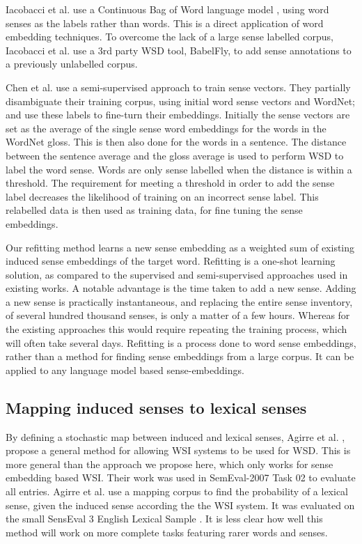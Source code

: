 \documentclass{article}
\def\parencite{\cite}
\begin{document}
Iacobacci et al.  use a Continuous Bag of Word language model \parencite{mikolov2013efficient}, using word senses as the labels rather than words.
This is a direct application of word embedding techniques.
To overcome the lack of a large sense labelled corpus, Iacobacci et al. use a 3rd party WSD tool, BabelFly, to add sense annotations to a previously unlabelled corpus.

Chen et al.  use a semi-supervised approach to train sense vectors.
They partially disambiguate their training corpus, using initial word sense vectors and WordNet; and use these labels to fine-turn their embeddings.
Initially the sense vectors are set as the average of the single sense word embeddings \parencite{mikolov2013efficient} for the words in the WordNet gloss.
This is then also done for the words in a sentence.
The distance between the sentence average and the gloss average is used to perform WSD to label the word sense. Words are only sense labelled when the distance is within a threshold.
The requirement for meeting a threshold in order to add the sense label  decreases the likelihood of training on an incorrect sense label.
This relabelled data is then used as training data, for fine tuning the sense embeddings.


Our refitting method learns a new sense embedding as a weighted sum of existing induced sense embeddings of the target word.
Refitting is a one-shot learning solution, as compared to the supervised and semi-supervised approaches used in existing works.
A notable advantage is the time taken to add a new sense.
Adding a new sense is practically instantaneous, and replacing the entire sense inventory, of several hundred thousand senses, is only a matter of a few hours.
Whereas for the existing approaches this would require repeating the training process, which will often take several days.
Refitting is a process done to word sense embeddings, rather than a method for finding sense embeddings from a large corpus. 
It can be applied to any language model based sense-embeddings.


\subsection{Mapping induced senses to lexical senses}\label{mapping}
By defining a stochastic map between induced and lexical senses, Agirre et al. , propose a general method for allowing WSI systems to be used for WSD.
This is more general than the approach we propose here, which only works for sense embedding based WSI. 
Their work was used in SemEval-2007 Task 02 \parencite{SemEval2007WSIandWSD} to evaluate all entries. 
Agirre et al. use a mapping corpus to find the probability of a lexical sense, given the induced sense according the the WSI system.
It was evaluated on the small SensEval 3 English Lexical Sample \parencite{mihalcea2004senseval}. It is less clear how well this method will work on more complete tasks featuring rarer words and senses. 
\end{document}
